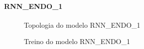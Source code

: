 \documentclass[	12pt, Times, openright, twoside, a4paper, english, brazil]{abntex2}
\begin{document}
              \paragraph{RNN\_ENDO\_1}
                \begin{figure}[!ht]
                  \caption{Topologia do modelo RNN\_ENDO\_1 \label{fig:case1_rnn_endo1} }
                \end{figure}

                \begin{figure}[!ht]
                  \caption{Treino do modelo RNN\_ENDO\_1 \label{fig:case1_rnn_endo1_train} }
                \end{figure}
\end{document}
